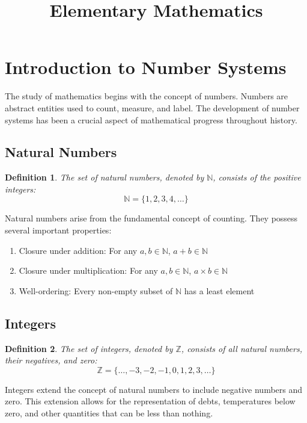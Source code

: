 \documentclass[12pt,a4paper]{article}
\title{}
\author{}
\date{}
\title{\textcolor{draculaYellow}{\Huge Elementary Mathematics}}
\newtheorem{definition}{Definition}
\begin{document}
\maketitle

\tableofcontents

\section{Introduction to Number Systems}

The study of mathematics begins with the concept of numbers. Numbers are abstract entities used to count, measure, and label. The development of number systems has been a crucial aspect of mathematical progress throughout history.

\subsection{Natural Numbers}

\begin{definition}
The set of natural numbers, denoted by $\mathbb{N}$, consists of the positive integers:
\[ \mathbb{N} = \{1, 2, 3, 4, \ldots\} \]
\end{definition}

Natural numbers arise from the fundamental concept of counting. They possess several important properties:

\begin{enumerate}
    \item Closure under addition: For any $a, b \in \mathbb{N}$, $a + b \in \mathbb{N}$
    \item Closure under multiplication: For any $a, b \in \mathbb{N}$, $a \times b \in \mathbb{N}$
    \item Well-ordering: Every non-empty subset of $\mathbb{N}$ has a least element
\end{enumerate}

\subsection{Integers}

\begin{definition}
The set of integers, denoted by $\mathbb{Z}$, consists of all natural numbers, their negatives, and zero:
\[ \mathbb{Z} = \{\ldots, -3, -2, -1, 0, 1, 2, 3, \ldots\} \]
\end{definition}

Integers extend the concept of natural numbers to include negative numbers and zero. This extension allows for the representation of debts, temperatures below zero, and other quantities that can be less than nothing.
\end{document}
